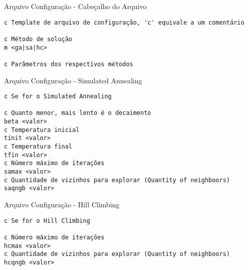 			
			
			\begin{frame}[fragile]{Arquivo Configuração - Cabeçalho do Arquivo}
				
					
					{
						\footnotesize
						\begin{block}{}
							
							\begin{verbatim}
c Template de arquivo de configuração, 'c' equivale a um comentário

c Método de solução
m <ga|sa|hc>

c Parâmetros dos respectivos métodos 
							\end{verbatim}	
						\end{block}
					}
				
			\end{frame}
			
			\begin{frame}[fragile]{Arquivo Configuração - Simulated Annealing}
				
					
					{
						\footnotesize
						\begin{block}{}
							
							\begin{verbatim}
c Se for o Simulated Annealing

c Quanto menor, mais lento é o decaimento
beta <valor>
c Temperatura inicial
tinit <valor>
c Temperatura final
tfin <valor>
c Número máximo de iterações
samax <valor>
c Quantidade de vizinhos para explorar (Quantity of neighboors)
saqngb <valor>
							\end{verbatim}	
						\end{block}
					}
				
			\end{frame}
			
			\begin{frame}[fragile]{Arquivo Configuração - Hill Climbing}
				
					
					{
						\footnotesize
						\begin{block}{}
							
							\begin{verbatim}
c Se for o Hill Climbing

c Número máximo de iterações
hcmax <valor>
c Quantidade de vizinhos para explorar (Quantity of neighboors)
hcqngb <valor>
							\end{verbatim}	
						\end{block}
					}
				
			\end{frame}
			
